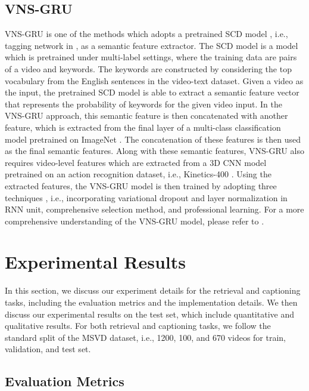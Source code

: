 \documentclass{article}
\begin{document}
\subsection{VNS-GRU}
VNS-GRU \cite{DBLP:conf/ecai/Chen0020a} is one of the methods which adopts a pretrained SCD model \cite{SCN_CVPR2017}, i.e., tagging network in \cite{DBLP:conf/ecai/Chen0020a}, as a semantic feature extractor. The SCD model is a model which is pretrained under multi-label settings, where the training data are pairs of a video and keywords. The keywords are constructed by considering the top  vocabulary from the English sentences in the video-text dataset. Given a video as the input, the pretrained SCD model is able to extract a semantic feature vector that represents the probability of keywords for the given video input. In the VNS-GRU approach, this semantic feature is then concatenated with another feature, which is extracted from the final layer of a multi-class classification model pretrained on ImageNet \cite{deng2009imagenet}. The concatenation of these features is then used as the final semantic features. Along with these semantic features, VNS-GRU also requires video-level features which are extracted from a 3D CNN model pretrained on an action recognition dataset, i.e., Kinetics-400 \cite{DBLP:journals/corr/KayCSZHVVGBNSZ17}. Using the extracted features, the VNS-GRU model is then trained by adopting three techniques \cite{DBLP:conf/ecai/Chen0020a}, i.e., incorporating variational dropout and layer normalization in RNN unit, comprehensive selection method, and professional learning. For a more comprehensive understanding of the VNS-GRU model, please refer to \cite{DBLP:conf/ecai/Chen0020a}.

\section{Experimental Results}
\label{sec:experiments}
In this section, we discuss our experiment details for the retrieval and captioning tasks, including the evaluation metrics and the implementation details. We then discuss our experimental results on the test set, which include quantitative and qualitative results. For both retrieval and captioning tasks, we follow the standard split of the MSVD dataset, i.e., 1200, 100, and 670 videos for train, validation, and test set.

\subsection{Evaluation Metrics}
\end{document}
